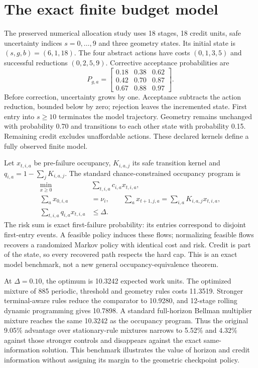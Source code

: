 \section{The exact finite budget model}\label{app:finite}
The preserved numerical allocation study uses 18 stages, 18 credit units, safe uncertainty indices $s=0,\ldots,9$ and three geometry states. Its initial state is $(s,g,b)=(6,1,18)$. The four abstract actions have costs $(0,1,3,5)$ and successful reductions $(0,2,5,9)$. Corrective acceptance probabilities are
\begin{equation}
P_{g,a}=\begin{bmatrix}0.18&0.38&0.62\\0.42&0.70&0.87\\0.67&0.88&0.97\end{bmatrix}.\label{eq:finite-kernel}
\end{equation}
Before correction, uncertainty grows by one. Acceptance subtracts the action reduction, bounded below by zero; rejection leaves the incremented state. First entry into $s\ge10$ terminates the model trajectory. Geometry remains unchanged with probability 0.70 and transitions to each other state with probability 0.15. Remaining credit excludes unaffordable actions. These declared kernels define a fully observed finite model.

Let $x_{t,i,a}$ be pre-failure occupancy, $K_{i,a,j}$ its safe transition kernel and $q_{i,a}=1-\sum_jK_{i,a,j}$. The standard chance-constrained occupancy program is
\begin{align}
\min_{x\ge0}\ &\sum_{t,i,a}c_{i,a}x_{t,i,a},\\
\sum_a x_{0,i,a}&=\nu_i,\qquad
\sum_a x_{t+1,j,a}=\sum_{i,a}K_{i,a,j}x_{t,i,a},\\
\sum_{t,i,a}q_{i,a}x_{t,i,a}&\le\Delta.\label{eq:finite-lp}
\end{align}
The risk sum is exact first-failure probability: its entries correspond to disjoint first-entry events. A feasible policy induces these flows; normalizing feasible flows recovers a randomized Markov policy with identical cost and risk. Credit is part of the state, so every recovered path respects the hard cap. This is an exact model benchmark, not a new general occupancy-equivalence theorem.

At $\Delta=0.10$, the optimum is 10.3242 expected work units. The optimized mixture of 885 periodic, threshold and geometry rules costs 11.3519. Stronger terminal-aware rules reduce the comparator to 10.9280, and 12-stage rolling dynamic programming gives 10.7898. A standard full-horizon Bellman multiplier mixture reaches the same 10.3242 as the occupancy program. Thus the original 9.05\% advantage over stationary-rule mixtures narrows to 5.52\% and 4.32\% against those stronger controls and disappears against the exact same-information solution. This benchmark illustrates the value of horizon and credit information without assigning its margin to the geometric checkpoint policy.

